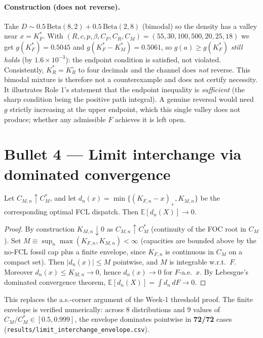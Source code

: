 \paragraph{Construction (does not reverse).} Take
$D\sim 0.5\,\mathrm{Beta}(8,2)+0.5\,\mathrm{Beta}(2,8)$ (bimodal) so the
density has a valley near $x=K_F^*$. With $(R,c,p,\beta,C_F,C_R,C_M)
=(55,30,100,500,20,25,18)$ we get $g(K_F^*)=0.5045$ and
$g(K_F^*-K_M^*)=0.5061$, so $g(a)\ge g(K_F^*)$ \emph{still holds} (by
$1.6\!\times\!10^{-3}$): the endpoint condition is satisfied, not violated.
Consistently, $K_R^*=K_R^\circ$ to four decimals and the channel does
\emph{not} reverse. This bimodal mixture is therefore not a counterexample
and does not certify necessity. It illustrates Role 1's statement that the
endpoint inequality is \emph{sufficient} (the sharp condition being the
positive path integral). A genuine reversal would need $g$ strictly
increasing at the upper endpoint, which this single valley does not
produce; whether any admissible $F$ achieves it is left open.

\section{Bullet 4 --- Limit interchange via dominated convergence}
\begin{lemma}
Let $C_{M,n}\uparrow C_M^{\!*}$, and let
$d_n(x)=\min\{(K_{F,n}-x)_+,K_{M,n}\}$ be the corresponding optimal FCL
dispatch. Then $\mathbb E[d_n(X)]\to 0$.
\end{lemma}
\begin{proof}
By construction $K_{M,n}\downarrow 0$ as $C_{M,n}\uparrow C_M^{\!*}$
(continuity of the FOC root in $C_M$). Set
$M\equiv \sup_n\max(K_{F,n},K_{M,n})<\infty$ (capacities are bounded above
by the no-FCL fossil cap plus a finite envelope, since $K_{F,n}$ is
continuous in $C_M$ on a compact set). Then
$|d_n(x)|\le M$ pointwise, and $M$ is integrable w.r.t.\ $F$. Moreover
$d_n(x)\le K_{M,n}\to 0$, hence $d_n(x)\to 0$ for $F$-a.e.\ $x$.
By Lebesgue's dominated convergence theorem,
$\mathbb E[d_n(X)]=\int d_n\,dF\to 0$.
\end{proof}
This replaces the a.s.-corner argument of the Week-1 threshold proof.
The finite envelope is verified numerically: across 8 distributions and 9
values of $C_M/C_M^{\!*}\in[0.5,0.999]$, the envelope dominates pointwise
in \textbf{72/72} cases (\texttt{results/limit\_interchange\_envelope.csv}).

